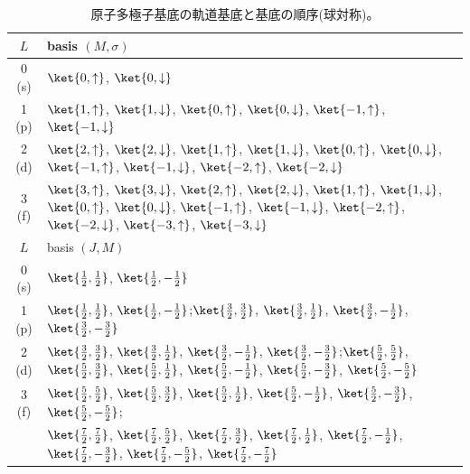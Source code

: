 \documentclass[11pt]{easymemo}
\begin{document}
\begin{table}[t!]
\begin{center}
\small
\caption{原子多極子基底の軌道基底と基底の順序(球対称)。}
\label{tbl:orbbasis}
\begin{tabular}{cl} \hline\hline
$L$ & basis $(M,\sigma)$ \\ \hline
0 (s) & $\ket{0,\uparrow}$, $\ket{0,\downarrow}$ \\
1 (p) & $\ket{1,\uparrow}$, $\ket{1,\downarrow}$, $\ket{0,\uparrow}$, $\ket{0,\downarrow}$, $\ket{-1,\uparrow}$, $\ket{-1,\downarrow}$ \\
2 (d) & $\ket{2,\uparrow}$, $\ket{2,\downarrow}$, $\ket{1,\uparrow}$, $\ket{1,\downarrow}$, $\ket{0,\uparrow}$, $\ket{0,\downarrow}$, $\ket{-1,\uparrow}$, $\ket{-1,\downarrow}$, $\ket{-2,\uparrow}$, $\ket{-2,\downarrow}$ \\
3 (f) & $\ket{3,\uparrow}$, $\ket{3,\downarrow}$, $\ket{2,\uparrow}$, $\ket{2,\downarrow}$, $\ket{1,\uparrow}$, $\ket{1,\downarrow}$, $\ket{0,\uparrow}$, $\ket{0,\downarrow}$, $\ket{-1,\uparrow}$, $\ket{-1,\downarrow}$, $\ket{-2,\uparrow}$, $\ket{-2,\downarrow}$, $\ket{-3,\uparrow}$, $\ket{-3,\downarrow}$ \\ \hline
$L$ & basis $(J,M)$ \\ \hline
0 (s) & $\ket{\frac{1}{2},\frac{1}{2}}$, $\ket{\frac{1}{2},-\frac{1}{2}}$ \\
1 (p) & $\ket{\frac{1}{2},\frac{1}{2}}$, $\ket{\frac{1}{2},-\frac{1}{2}}$;\quad $\ket{\frac{3}{2},\frac{3}{2}}$, $\ket{\frac{3}{2},\frac{1}{2}}$, $\ket{\frac{3}{2},-\frac{1}{2}}$, $\ket{\frac{3}{2},-\frac{3}{2}}$ \\
2 (d) & $\ket{\frac{3}{2},\frac{3}{2}}$, $\ket{\frac{3}{2},\frac{1}{2}}$, $\ket{\frac{3}{2},-\frac{1}{2}}$, $\ket{\frac{3}{2},-\frac{3}{2}}$;\quad $\ket{\frac{5}{2},\frac{5}{2}}$, $\ket{\frac{5}{2},\frac{3}{2}}$, $\ket{\frac{5}{2},\frac{1}{2}}$, $\ket{\frac{5}{2},-\frac{1}{2}}$, $\ket{\frac{5}{2},-\frac{3}{2}}$, $\ket{\frac{5}{2},-\frac{5}{2}}$ \\
3 (f) & $\ket{\frac{5}{2},\frac{5}{2}}$, $\ket{\frac{5}{2},\frac{3}{2}}$, $\ket{\frac{5}{2},\frac{1}{2}}$, $\ket{\frac{5}{2},-\frac{1}{2}}$, $\ket{\frac{5}{2},-\frac{3}{2}}$, $\ket{\frac{5}{2},-\frac{5}{2}}$; \\
& $\ket{\frac{7}{2},\frac{7}{2}}$, $\ket{\frac{7}{2},\frac{5}{2}}$, $\ket{\frac{7}{2},\frac{3}{2}}$, $\ket{\frac{7}{2},\frac{1}{2}}$, $\ket{\frac{7}{2},-\frac{1}{2}}$, $\ket{\frac{7}{2},-\frac{3}{2}}$, $\ket{\frac{7}{2},-\frac{5}{2}}$, $\ket{\frac{7}{2},-\frac{7}{2}}$ \\
\hline\hline
\end{tabular}
\end{center}
\end{table}
\end{document}
